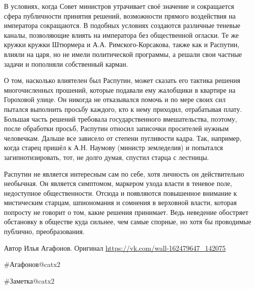 В условиях, когда Совет министров утрачивает своё значение и сокращается сфера публичности принятия решений, возможности прямого воздействия на императора сокращаются. В подобных условиях создаются различные теневые каналы, позволяющие влиять на императора без общественной огласки. Те же кружки кружки Штюрмера и А.А. Римского-Корсакова, также как и Распутин, влияли на царя, но не имели политической программы, а решали свои частные задачи и пополняли собственный карман.

О том, насколько влиятелен был Распутин, может сказать его тактика решения многочисленных прошений, которые подавали ему жалобщики в квартире на Гороховой улице. Он никогда не отказывался помочь и по мере своих сил пытался выполнить просьбу каждого, кто к нему приходил, отрабатывая плату. Большая часть решений требовала государственного вмешательства, поэтому, после обработки просьб, Распутин относил записочки просителей нужным человечкам. Дальше все зависело от степени пугливости кадра. Так, например, когда старец пришёл к А.Н. Наумову (министр земледелия) и попытался загипнотизировать, тот, не долго думая, спустил старца с лестницы.

Распутин не является интересным сам по себе, хотя личность он действительно необычная. Он является симптомом, маркером ухода власти в теневое поле, недоступное общественности. Отсюда и появляются повышенное внимание к мистическим старцам, шпиономания и сомнения в верховной власти, которая попросту не говорит о том, какие решения принимает. Ведь неведение обостряет обстановку в обществе куда сильнее, чем самые спорные, но хотя бы проводимые публично, преобразования.

Автор Илья Агафонов. Оригинал \url{https://vk.com/wall-162479647_142075}

\#Агафонов@catx2

\#Заметка@catx2
